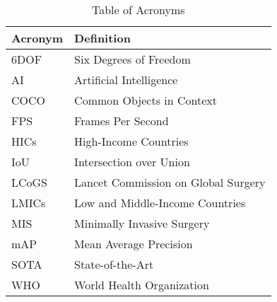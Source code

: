 \begin{table}[h]
    \centering
    \caption{Table of Acronyms}
    \begin{tabular}{ll}
      \toprule
      \textbf{Acronym} & \textbf{Definition} \\
      \midrule
      6DOF & Six Degrees of Freedom \\
      AI & Artificial Intelligence \\
      COCO & Common Objects in Context \\
      FPS & Frames Per Second \\
      HICs & High-Income Countries \\
      IoU & Intersection over Union \\
      LCoGS & Lancet Commission on Global Surgery \\
      LMICs & Low and Middle-Income Countries \\
      MIS & Minimally Invasive Surgery \\
      mAP & Mean Average Precision \\
      SOTA & State-of-the-Art \\
      WHO & World Health Organization \\
      \bottomrule
    \end{tabular}
    \label{tab:acronyms}
  \end{table}
